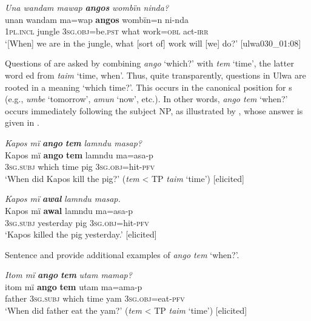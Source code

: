\newpage

\ea%
    \label{ex:syntax:35}
          \textit{Una wandam mawap} \textbf{\textit{angos}} \textit{wombïn ninda?}\\
\gll    unan    wandam  ma=wap      \textbf{angos}  wombïn=n  ni-nda\\
    1\textsc{pl.incl}  jungle    3\textsc{sg.obj}=be.\textsc{pst}  what  work\textsc{=obl}  act-\textsc{irr}\\
\glt `[When] we are in the jungle, what [sort of] work will [we] do?’ [ulwa030\_01:08]
\z

Questions of  are asked by combining \textit{ango} ‘which?’ with \textit{tem} ‘time’, the latter word ed from  \textit{taim} ‘time, when’. Thus, quite transparently,  questions in Ulwa are rooted in a  meaning ‘which time?’. This  occurs in the canonical position for s (e.g., \textit{umbe} ‘tomorrow’, \textit{amun} ‘now’, etc.). In other words, \textit{ango tem} ‘when?’ occurs immediately following the subject NP, as illustrated by , whose answer is given in .

\ea%
    \label{ex:syntax:36}
          \textit{Kapos mï} \textbf{\textit{ango}} \textbf{\textit{tem}} \textit{lamndu masap?}\\
\gll Kapos  mï      \textbf{ango}  \textbf{tem}  lamndu  ma=asa-p\\
    [name]  \textsc{3sg.subj}  which  time  pig      \textsc{3sg.obj}=hit-\textsc{pfv}\\
\glt `When did Kapos kill the pig?’ (\textit{tem} < TP \textit{taim} ‘time’) [elicited]
\z

\ea%
    \label{ex:syntax:37}
          \textit{Kapos mï} \textbf{\textit{awal}} \textit{lamndu masap.}\\
\gll    Kapos  mï      \textbf{awal}    lamndu  ma=asa-p\\
    [name]  \textsc{3sg.subj}  yesterday  pig      \textsc{3sg.obj=}hit-\textsc{pfv}\\
\glt `Kapos killed the pig yesterday.’ [elicited]
\z

Sentence  and  provide additional examples of \textit{ango tem} ‘when?’.

\ea%
    \label{ex:syntax:38}
          \textit{Itom mï} \textbf{\textit{ango}} \textbf{\textit{tem}} \textit{utam mamap?}\\
\gll    itom  mï      \textbf{ango}  \textbf{tem}  utam  ma=ama-p\\
    father  \textsc{3sg.subj}  which  time  yam  3\textsc{sg.obj=}eat-\textsc{pfv}\\
\glt `When did father eat the yam?’ (\textit{tem} < TP \textit{taim} ‘time’) [elicited]
\z

